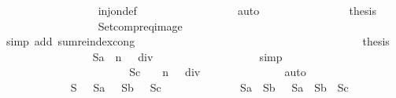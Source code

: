\begin{isabellebody}
\ \ \ \ \ \ \ \ \ \ \ \ \ \ \ \ \isamarkupfalse%
\ inj{\isacharunderscore}on{\isacharunderscore}def\isanewline
\ \ \ \ \ \ \ \ \ \ \ \ \ \ \ \ \isamarkupfalse%
\ auto\isanewline
\ \ \ \ \ \ \ \ \ \ \ \ \ \ \isamarkupfalse%
\ {\isacharquery}thesis\isanewline
\ \ \ \ \ \ \ \ \ \ \ \ \ \ \ \ \isamarkupfalse%
\ Setcompr{\isacharunderscore}eq{\isacharunderscore}image\isanewline
\ \ \ \ \ \ \ \ \ \ \ \ \ \ \ \ \isamarkupfalse%
\ {\isacharparenleft}simp\ add{\isacharcolon}\ sum{\isachardot}reindex{\isacharunderscore}cong{\isacharparenright}\isanewline
\ \ \ \ \ \ \ \ \ \ \ \ \isamarkupfalse%
\isanewline
\ \ \ \ \ \ \ \ \ \ \ \ \isamarkupfalse%
\ \isanewline
\ \ \ \ \ \ \ \ \ \ \ \ \isamarkupfalse%
\ {\isacharquery}thesis\isanewline
\ \ \ \ \ \ \ \ \ \ \ \ \ \ \isamarkupfalse%
\ {\isacharbackquoteopen}{\isasymSum}\ {\isacharquery}Sa\ {\isacharequal}\ {\isacharparenleft}{}{\isacharcircum}n\ {\isacharminus}\ {}{\isacharparenright}\ div\ {}\ {\isacharminus}\ {}{\isacharbackquoteclose}\isanewline
\ \ \ \ \ \ \ \ \ \ \ \ \ \ \isamarkupfalse%
\ simp\isanewline
\ \ \ \ \ \ \ \ \ \ \isamarkupfalse%
\isanewline
\isanewline
\ \ \ \ \ \ \ \ \ \ \isamarkupfalse%
\isanewline
\isanewline
\ \ \ \ \ \ \ \ \ \ \isamarkupfalse%
\ {\isachardoublequoteopen}{\isasymSum}\ {\isacharquery}Sc\ {\isacharequal}\ {\isacharparenleft}{}\ {\isacharcircum}\ n\ {\isacharplus}\ {}{\isacharparenright}\ div\ {}{\isachardoublequoteclose}\isanewline
\ \ \ \ \ \ \ \ \ \ \ \ \isamarkupfalse%
\ auto\isanewline
\isanewline
\ \ \ \ \ \ \ \ \ \ \isamarkupfalse%
\isanewline
\isanewline
\ \ \ \ \ \ \ \ \ \ \isamarkupfalse%
\ {\isachardoublequoteopen}{\isasymSum}\ {\isacharquery}S\ {\isacharequal}\ {\isasymSum}\ {\isacharquery}Sa\ {\isacharplus}\ {\isasymSum}\ {\isacharquery}Sb\ {\isacharplus}\ {\isasymSum}\ {\isacharquery}Sc{\isachardoublequoteclose}\isanewline
\ \ \ \ \ \ \ \ \ \ \ \ \isamarkupfalse%
\ {\isacharbackquoteopen}{\isacharquery}Sa\ {\isasyminter}\ {\isacharquery}Sb\ {\isacharequal}\ {\isacharbraceleft}{\isacharbraceright}{\isacharbackquoteclose}\ {\isacharbackquoteopen}{\isacharparenleft}{\isacharquery}Sa\ {\isasymunion}\ {\isacharquery}Sb{\isacharparenright}\ {\isasyminter}\ {\isacharquery}Sc\ {\isacharequal}\ {\isacharbraceleft}{\isacharbraceright}{\isacharbackquoteclose}\isanewline

\end{isabellebody}
